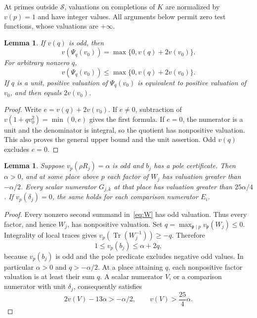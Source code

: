 \documentclass[11pt,a4paper]{article}
\newtheorem{lemma}[theorem]{Lemma}
\DeclareMathOperator{\Tr}{Tr}
\begin{document}
At primes outside $\mathcal S$, valuations on completions of $K$
are normalized by $v(p)=1$ and have integer values. All arguments
below permit zero test functions, whose valuations are $+\infty$.

\begin{lemma}\label{lem:psi}
If $v(q)$ is odd, then
\[
 v(\Psi_q(v_0))=\max\{0,v(q)+2v(v_0)\}.
\]
For arbitrary nonzero $q$,
\[
 v(\Psi_q(v_0))\le\max\{0,v(q)+2v(v_0)\}.
\]
If $q$ is a unit, positive valuation of $\Psi_q(v_0)$ is equivalent
to positive valuation of $v_0$, and then equals $2v(v_0)$.
\end{lemma}
\begin{proof}
Write $e=v(q)+2v(v_0)$. If $e\ne0$, subtraction of
$v(1+qv_0^2)=\min(0,e)$ gives the first formula. If $e=0$,
the numerator is a unit and the denominator is integral, so the
quotient has nonpositive valuation. This also proves the general
upper bound and the unit assertion. Odd $v(q)$ excludes $e=0$.
\end{proof}

\begin{lemma}\label{lem:trace}
Suppose $v_p(\rho R_j)=\alpha$ is odd and $b_j$ has a pole
certificate. Then $\alpha>0$, and at some place above $p$ each
factor of $W_j$ has valuation greater than $-\alpha/2$.
Every scalar numerator $G_{j,k}$ at that place has valuation greater
than $25\alpha/4$. If $v_p(\delta_j)=0$, the same holds for each
comparison numerator $E_i$.
\end{lemma}
\begin{proof}
Every nonzero second summand in~\eqref{eq:W} has odd
valuation. Thus every factor, and hence $W_j$, has nonpositive
valuation. Set $q=\max_{\mathfrak p\mid p}v_{\mathfrak p}(W_j)\le0$.
Integrality of local traces gives
$v_p(\Tr(W_j^{-1}))\ge-q$. Therefore
\[
 1\le v_p(b_j)\le\alpha+2q,
\]
because $v_p(b_j)$ is odd and the pole predicate excludes negative
odd values. In particular $\alpha>0$ and $q>-\alpha/2$.
At a place attaining $q$, each nonpositive factor valuation is at
least their sum $q$. A scalar numerator $V$, or a comparison
numerator with unit $\delta_j$, consequently satisfies
\[
 2v(V)-13\alpha>-\alpha/2,
 \qquad v(V)>\frac{25}{4}\alpha.
\]
\end{proof}
\end{document}
